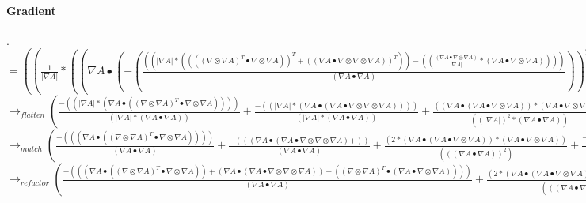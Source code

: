 \documentclass{article}
\begin{document}
 \paragraph{Gradient}.\\

$= (( \frac{1}{| \nabla A|}*(( \nabla A \bullet (-( \frac{((| \nabla A|*(((( \nabla  \otimes  \nabla A)^T \bullet  \nabla  \otimes  \nabla A))^T+(( \nabla A \bullet  \nabla  \otimes  \nabla  \otimes  \nabla A))^T))-(( \frac{( \nabla A \bullet  \nabla  \otimes  \nabla A)}{| \nabla A|}*( \nabla A \bullet  \nabla  \otimes  \nabla A))))}{( \nabla A \bullet  \nabla A)}))^T)+(-( \frac{( \nabla A \bullet  \nabla  \otimes  \nabla A)}{| \nabla A|}) \bullet  \nabla  \otimes  \nabla A)))+((-( \frac{( \nabla A \bullet  \nabla  \otimes  \nabla A)}{| \nabla A|}) \bullet  \nabla A)* \frac{-((( \nabla A \bullet  \nabla  \otimes  \nabla A)))}{(| \nabla A|*( \nabla A \bullet  \nabla A))}))$
 \\
\newline $\rightarrow_{flatten}( \frac{-((| \nabla A|*( \nabla A \bullet (( \nabla  \otimes  \nabla A)^T \bullet  \nabla  \otimes  \nabla A))))}{(| \nabla A|*( \nabla A \bullet  \nabla A))}+ \frac{-((| \nabla A|*( \nabla A \bullet ( \nabla A \bullet  \nabla  \otimes  \nabla  \otimes  \nabla A))))}{(| \nabla A|*( \nabla A \bullet  \nabla A))}+ \frac{(( \nabla A \bullet ( \nabla A \bullet  \nabla  \otimes  \nabla A))*( \nabla A \bullet  \nabla  \otimes  \nabla A))}{((| \nabla A|)^2*( \nabla A \bullet  \nabla A))}+ \frac{-(((( \nabla  \otimes  \nabla A)^T \bullet ( \nabla A \bullet  \nabla  \otimes  \nabla A))))}{((| \nabla A|)^2)}+ \frac{(( \nabla A \bullet ( \nabla A \bullet  \nabla  \otimes  \nabla A))*( \nabla A \bullet  \nabla  \otimes  \nabla A))}{((| \nabla A|)^2*( \nabla A \bullet  \nabla A))})$\\
\newline $\rightarrow_{match}( \frac{-((( \nabla A \bullet (( \nabla  \otimes  \nabla A)^T \bullet  \nabla  \otimes  \nabla A))))}{( \nabla A \bullet  \nabla A)}+ \frac{-((( \nabla A \bullet ( \nabla A \bullet  \nabla  \otimes  \nabla  \otimes  \nabla A))))}{( \nabla A \bullet  \nabla A)}+ \frac{(2*( \nabla A \bullet ( \nabla A \bullet  \nabla  \otimes  \nabla A))*( \nabla A \bullet  \nabla  \otimes  \nabla A))}{((( \nabla A \bullet  \nabla A))^2)}+ \frac{-(((( \nabla  \otimes  \nabla A)^T \bullet ( \nabla A \bullet  \nabla  \otimes  \nabla A))))}{( \nabla A \bullet  \nabla A)})$\\
\newline $\rightarrow_{refactor}( \frac{-((( \nabla A \bullet (( \nabla  \otimes  \nabla A)^T \bullet  \nabla  \otimes  \nabla A))+( \nabla A \bullet ( \nabla A \bullet  \nabla  \otimes  \nabla  \otimes  \nabla A))+(( \nabla  \otimes  \nabla A)^T \bullet ( \nabla A \bullet  \nabla  \otimes  \nabla A))))}{( \nabla A \bullet  \nabla A)}+ \frac{(2*( \nabla A \bullet ( \nabla A \bullet  \nabla  \otimes  \nabla A))*( \nabla A \bullet  \nabla  \otimes  \nabla A))}{((( \nabla A \bullet  \nabla A))^2)})$\\
\end{document}
